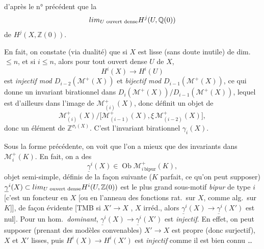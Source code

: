 \documentclass[11pt,a4paper]{article}
\begin{document}
d'après le n° précédent que la  
\[
  \varinjlim_{U \text{ ouvert dense}} H^{j}(U, \mathbb{Q}(0))
\]
de $H^{j}(X, \mathbb{Z}(0))$.

En fait, on constate (via dualité) que si $X$ est lisse (sans doute inutile) de dim.\ $\leq n$, et si $i \leq n$, alors pour tout ouvert dense $U$ de $X$,
\[
  H^{i}(X) \longrightarrow H^{i}(U)
\]
est  \emph{injectif mod $D_{i-2}(\mathcal{M}^{+}(X))$} et \emph{bijectif mod $D_{i-1}(\mathcal{M}^{+}(X))$}, ce qui donne un invariant birationnel dans $D_{i}(\mathcal{M}^{+}(X)) / D_{i-1}(\mathcal{M}^{+}(X))$, lequel est d'ailleurs dans l'image de $\mathcal{M}^{+}_{(i)}(X)$, donc définit un objet de
\[
  \mathcal{M}^{+}_{(i)}(X) \big/ \bigl[\mathcal{M}^{+}_{(i-1)}(X), \xi\,\mathcal{M}^{+}_{(i-2)}(X)\bigr],
\]
donc un élément de $\mathbb{Z}^{\sigma_{i}(X)}$. C'est l'invariant birationnel $\gamma_{i}(X)$.

Sous la forme précédente, on voit que l'on a mieux que des invariants dans $\mathcal{M}^{+}_{i}(K)$. En fait, on a des
\[
  \underline{\gamma}^{i}(X) \in \operatorname{Ob} \mathcal{M}^{+}_{i\,\mathrm{bipur}}(K),
\]
objet semi-simple, définis de la façon suivante ($K$ parfait, ce qu'on peut supposer) $\underline{\gamma}^{i}(X) \subset \varinjlim_{U \text{ ouvert dense}} H^{i}(U, \mathbb{Z}(0))$ est le plus grand sous-motif \emph{bipur} de type $i$ [c'est un foncteur en $X$  [ou en l'anneau des fonctions rat.\ sur $X$, comme alg.\ sur $K$]], de façon évidente [TMB si $X' \to X$ , $X$ irréd., alors $\underline{\gamma}^{i}(X) \to \underline{\gamma}^{i}(X')$ est nul]. Pour un hom.\ \emph{dominant}, $\underline{\gamma}^{i}(X) \to \underline{\gamma}^{i}(X')$ est \emph{injectif}. En effet, on peut supposer (prenant des modèles convenables) $X' \to X$ est propre (donc surjectif), $X$ et $X'$ lisses, puis $H^{i}(X) \to H^{i}(X')$ est \emph{injectif} comme il est bien connu \ldots
{}
\end{document}
